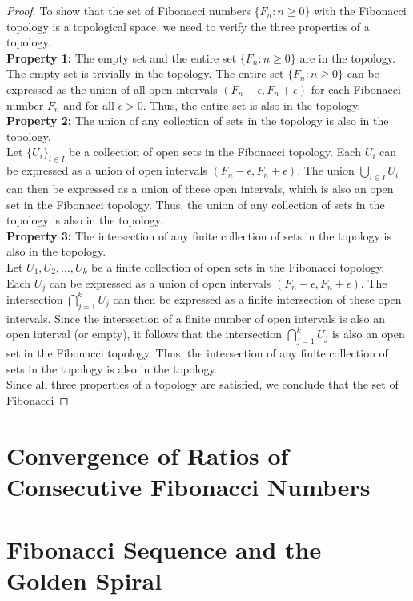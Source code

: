 \documentclass[openany]{book}
\begin{document}
\begin{proof}
    To show that the set of Fibonacci numbers $\{F_n : n \geq 0\}$ with the Fibonacci topology is a topological space, we need to verify the three properties of a topology. \\
    \textbf{Property 1:} The empty set and the entire set $\{F_n : n \geq 0\}$ are in the topology. \\
    The empty set is trivially in the topology. The entire set $\{F_n : n \geq 0\}$ can be expressed as the union of all open intervals $(F_n - \epsilon, F_n + \epsilon)$ for each Fibonacci number $F_n$ and for all $\epsilon > 0$. Thus, the entire set is also in the topology. \\
    \textbf{Property 2:} The union of any collection of sets in the topology is also in the topology. \\
    Let $\{U_i\}_{i \in I}$ be a collection of open sets in the Fibonacci topology. Each $U_i$ can be expressed as a union of open intervals $(F_n - \epsilon, F_n + \epsilon)$. The union $\bigcup_{i \in I} U_i$ can then be expressed as a union of these open intervals, which is also an open set in the Fibonacci topology. Thus, the union of any collection of sets in the topology is also in the topology. \\
    \textbf{Property 3:} The intersection of any finite collection of sets in the topology is also in the topology. \\
    Let $U_1, U_2, \ldots, U_k$ be a finite collection of open sets in the Fibonacci topology. Each $U_j$ can be expressed as a union of open intervals $(F_n - \epsilon, F_n + \epsilon)$. The intersection $\bigcap_{j=1}^{k} U_j$ can then be expressed as a finite intersection of these open intervals. Since the intersection of a finite number of open intervals is also an open interval (or empty), it follows that the intersection $\bigcap_{j=1}^{k} U_j$ is also an open set in the Fibonacci topology. Thus, the intersection of any finite collection of sets in the topology is also in the topology. \\
    Since all three properties of a topology are satisfied, we conclude that the set of Fibonacci
\end{proof}



\section{Convergence of Ratios of Consecutive Fibonacci Numbers}
\section{Fibonacci Sequence and the Golden Spiral}
\end{document}
